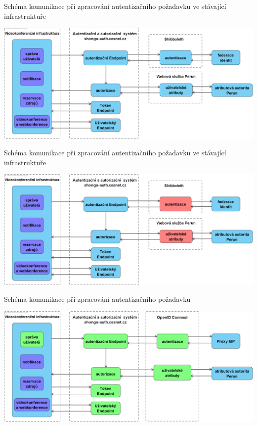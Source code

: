 \documentclass[
]{beamer}
\begin{document}
\begin{frame}{Schéma komunikace při zpracování autentizačního požadavku ve stávající infrastruktuře}

\includegraphics[width=\textwidth]{pics/meetings-old.png}
\end{frame}

\begin{frame}{Schéma komunikace při zpracování autentizačního požadavku ve stávající infrastruktuře}

\includegraphics[width=\textwidth]{pics/meetings-old-crash.png}
\end{frame}

\begin{frame}{Schéma komunikace při zpracování autentizačního požadavku}

\includegraphics[width=\textwidth]{pics/oidc-new.png}
\end{frame}
\end{document}
